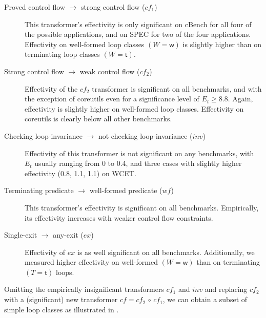 \begin{description}
    \item[Proved control flow $\rightarrow$ strong control flow ($cf_1$)] This transformer's effectivity is only significant on cBench for all four of the possible applications, and on SPEC for two of the four applications. Effectivity on well-formed loop classes $(W = \textsf{w})$ is slightly higher than on terminating loop classes $(W = \textsf{t})$.
\item[Strong control flow $\rightarrow$ weak control flow ($cf_2$)] Effectivity of the $cf_2$ transformer is significant on all benchmarks, and with the exception of coreutils even for a significance level of $E_t \ge 8.8$. Again, effectivity is slightly higher on well-formed loop classes. Effectivity on coreutils is clearly below all other benchmarks.
    \item[Checking loop-invariance $\rightarrow$ not checking loop-invariance ($inv$)] Effectivity of this trans\-for\-mer is not significant on any benchmarks, with $E_t$ usually ranging from 0 to 0.4, and three cases with slightly higher effectivity (0.8, 1.1, 1.1) on WCET.
\item[Terminating predicate $\rightarrow$ well-formed predicate ($wf$)] This transformer's effectivity is significant on all benchmarks. Empirically, its effectivity increases with weaker control flow constraints.
    \item[Single-exit $\rightarrow$ any-exit ($ex$)] Effectivity of $ex$ is as well significant on all benchmarks. Additionally, we measured higher effectivity on well-formed $(W = \textsf{w})$ than on terminating $(T = \textsf{t})$ loops.
\end{description}

Omitting the empirically insignificant transformers $cf_1$ and $inv$ and replacing $cf_2$ with a (significant) new transformer $cf = cf_2\,\circ\,cf_1$, we can obtain a subset of simple loop classes as illustrated in .

